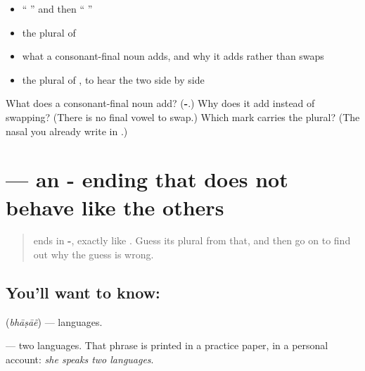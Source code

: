 \begin{itemize}
\raggedright
  \item \textquotedblleft{} \textquotedblright{} and then \textquotedblleft{} \textquotedblright{}
  \item the plural of \textbf{}
  \item what a consonant-final noun adds, and why it adds rather than swaps
  \item the plural of \textbf{}, to hear the two side by side
\end{itemize}

\begin{tcolorbox}[breakable,colback=teal!4,colframe=teal!35!black,title={Before you move on}]
What does a consonant-final noun add? (\textbf{-}.) Why does it add instead of swapping? (There is no final vowel to swap.) Which mark carries the plural? (The nasal you already write in \textbf{}.)
\end{tcolorbox}
\section[\texorpdfstring{\hi{भाषाएँ} (bhāṣāẽ)}{भाषाएँ (bhāṣāẽ)}]{ — an - ending that does not behave like the others}

\label{lesson:HI-C91-bhashaen}



\begin{quote}
\textbf{} ends in \textbf{-}, exactly like \textbf{}. Guess its plural from that, and then go on to find out why the guess is wrong.
\end{quote}

\subsection*{You'll want to know: }
\textbf{} (\emph{bhāṣāẽ}) — languages.

\textbf{ } — two languages. That phrase is printed in a practice paper, in a personal account: \emph{she speaks two languages}.

